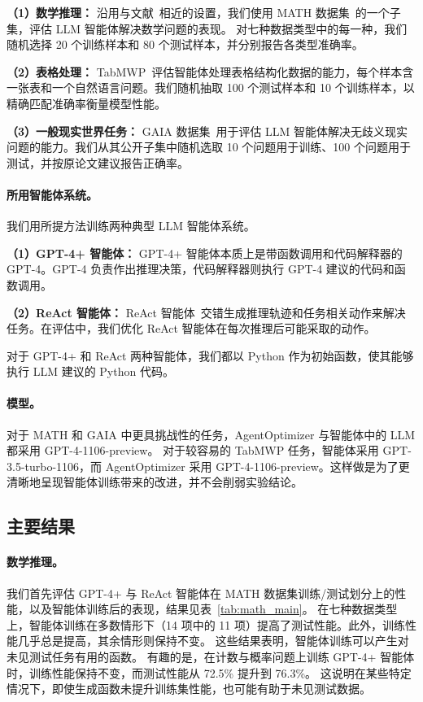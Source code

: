 \documentclass{article}
\begin{document}
\textbf{（1）数学推理：}
沿用与文献~\cite{yuan2023craft}相近的设置，我们使用 MATH 数据集~\cite{hendrycks2021measuring}的一个子集，评估 LLM 智能体解决数学问题的表现。
对七种数据类型中的每一种，我们随机选择 20 个训练样本和 80 个测试样本，并分别报告各类型准确率。

\textbf{（2）表格处理：}
TabMWP~\cite{lu2023dynamic}评估智能体处理表格结构化数据的能力，每个样本含一张表和一个自然语言问题。我们随机抽取 100 个测试样本和 10 个训练样本，以精确匹配准确率衡量模型性能。

\textbf{（3）一般现实世界任务：}
GAIA 数据集~\cite{mialon2023gaia}用于评估 LLM 智能体解决无歧义现实问题的能力。我们从其公开子集中随机选取 10 个问题用于训练、100 个问题用于测试，并按原论文建议报告正确率。

\paragraph{所用智能体系统。}
我们用所提方法训练两种典型 LLM 智能体系统。

\textbf{（1）GPT-4+ 智能体：}
GPT-4+ 智能体本质上是带函数调用和代码解释器的 GPT-4。GPT-4 负责作出推理决策，代码解释器则执行 GPT-4 建议的代码和函数调用。

\textbf{（2）ReAct 智能体：}
ReAct 智能体~\cite{yao2022react}交错生成推理轨迹和任务相关动作来解决任务。在评估中，我们优化 ReAct 智能体在每次推理后可能采取的动作。

对于 GPT-4+ 和 ReAct 两种智能体，我们都以 Python 作为初始函数，使其能够执行 LLM 建议的 Python 代码。

\paragraph{模型。}
对于 MATH 和 GAIA 中更具挑战性的任务，AgentOptimizer 与智能体中的 LLM 都采用 GPT-4-1106-preview。
对于较容易的 TabMWP 任务，智能体采用 GPT-3.5-turbo-1106，而 AgentOptimizer 采用 GPT-4-1106-preview。这样做是为了更清晰地呈现智能体训练带来的改进，并不会削弱实验结论。

\subsection{主要结果}
\label{section_main_result}

\paragraph{数学推理。}
我们首先评估 GPT-4+ 与 ReAct 智能体在 MATH 数据集训练/测试划分上的性能，以及智能体训练后的表现，结果见表~\ref{tab:math_main}。
在七种数据类型上，智能体训练在多数情形下（14 项中的 11 项）提高了测试性能。此外，训练性能几乎总是提高，其余情形则保持不变。
这些结果表明，智能体训练可以产生对未见测试任务有用的函数。
有趣的是，在计数与概率问题上训练 GPT-4+ 智能体时，训练性能保持不变，而测试性能从 72.5\% 提升到 76.3\%。
这说明在某些特定情况下，即使生成函数未提升训练集性能，也可能有助于未见测试数据。
\end{document}
